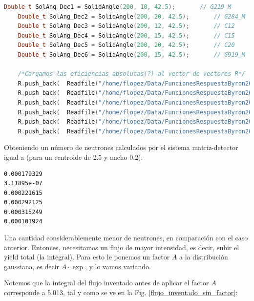 \documentclass[11pt,letterpaper]{article}
\begin{document}
\begin{lstlisting}[language=C++]
	Double_t SolAng_Dec1 = SolidAngle(200, 10, 42.5);		// G219_M
	Double_t SolAng_Dec2 = SolidAngle(200, 20, 42.5);		// G284_M
	Double_t SolAng_Dec3 = SolidAngle(200, 12, 42.5);		// C12
	Double_t SolAng_Dec4 = SolidAngle(200, 15, 42.5);		// C15
	Double_t SolAng_Dec5 = SolidAngle(200, 20, 42.5);		// C20
	Double_t SolAng_Dec6 = SolidAngle(200, 15, 42.5);		// G919_M

	/*Cargamos las eficiencias absolutas(?) al vector de vectores R*/
	R.push_back(  Readfile("/home/flopez/Data/FuncionesRespuestaByron2020/Efi_219_M_V4.root", "E219_M",SolAng_Dec1/(4*M_PI),cutbinlow, cutbinup)) ;
	R.push_back(  Readfile("/home/flopez/Data/FuncionesRespuestaByron2020/Efi_284_M_V4.root","E284_M", SolAng_Dec2/(4*M_PI), cutbinlow, cutbinup) );
	R.push_back(  Readfile("/home/flopez/Data/FuncionesRespuestaByron2020/Efi_C12_V4.root","EC12", SolAng_Dec3/(4*M_PI), cutbinlow, cutbinup) );
	R.push_back(  Readfile("/home/flopez/Data/FuncionesRespuestaByron2020/Efi_C15_V4.root","EC15",SolAng_Dec4/(4*M_PI), cutbinlow, cutbinup) );
	R.push_back(  Readfile("/home/flopez/Data/FuncionesRespuestaByron2020/Efi_C20_V4.root","EC20",SolAng_Dec5/(4*M_PI), cutbinlow, cutbinup) );
	R.push_back(  Readfile("/home/flopez/Data/FuncionesRespuestaByron2020/Efi_919_M_V4.root","E919_M",SolAng_Dec6/(4*M_PI),cutbinlow, cutbinup) );
\end{lstlisting}

Obteniendo un número de neutrones calculados por el sistema matriz-detector igual a (para un centroide de 2.5 y ancho 0.2):

\begin{lstlisting}[language=bash]
0.000179329
3.11895e-07
0.000221615
0.000292125
0.000315249
0.000101924
\end{lstlisting}

\begin{tip}
Una cantidad considerablemente menor de neutrones, en comparación con el caso anterior. Entonces, necesitamos un flujo de mayor intensidad, es decir, subir el yield total (la integral). Para esto le ponemos un factor $A$ a la distribución gaussiana, es decir $A\cdot \exp$, y lo vamos variando.
\end{tip}

Notemos que la integral del flujo inventado antes de aplicar el factor $A$ corresponde a 5.013, tal y como se ve en la Fig. \ref{flujo_inventado_sin_factor}:
\end{document}
